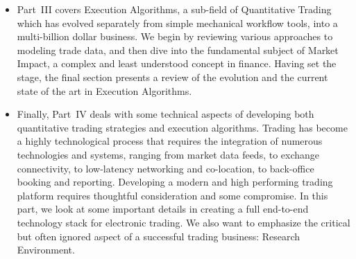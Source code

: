 \begin{itemize}
\item Part~III covers Execution Algorithms, a sub-field of Quantitative Trading which has evolved separately from simple mechanical workflow tools, into a multi-billion dollar business. We begin by reviewing various approaches to modeling trade data, and then dive into the fundamental subject of Market Impact, a complex and least understood concept in finance. Having set the stage, the final section presents a review of the evolution and the current state of the art in Execution Algorithms.

\item Finally, Part~IV deals with some technical aspects of developing both quantitative trading strategies and execution algorithms. Trading has become a highly technological process that requires the integration of numerous technologies and systems,  ranging from market data feeds, to exchange connectivity, to low-latency networking and co-location, to back-office booking and reporting. Developing a modern and high performing trading platform requires thoughtful consideration and some compromise. In this part, we look at some important details in creating a full end-to-end technology stack for electronic trading. We also want to emphasize the critical but often ignored aspect of a successful trading business: Research Environment.
\end{itemize} 

\newpage




 
